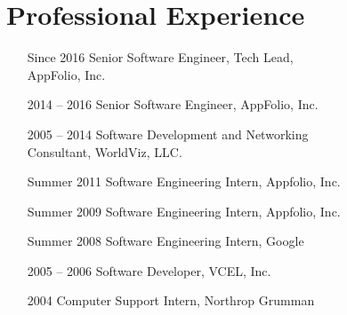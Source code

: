 \documentclass[10pt,letterpaper,oneside,twocolumn]{article}
\begin{document}
\section{Professional Experience}
\begin{itemize}
  \item [Since 2016] Senior Software Engineer, Tech Lead,\\ AppFolio, Inc.
  \item [2014 -- 2016] Senior Software Engineer, AppFolio, Inc.
  \item [2005 -- 2014] Software Development and Networking\\ Consultant,
    WorldViz, LLC.
  \item [Summer 2011] Software Engineering Intern, Appfolio, Inc.
  \item [Summer 2009] Software Engineering Intern, Appfolio, Inc.
  \item [Summer 2008] Software Engineering Intern, Google
  \item [2005 -- 2006] Software Developer, VCEL, Inc.
  \item [2004] Computer Support Intern, Northrop Grumman
\end{itemize}
\end{document}
